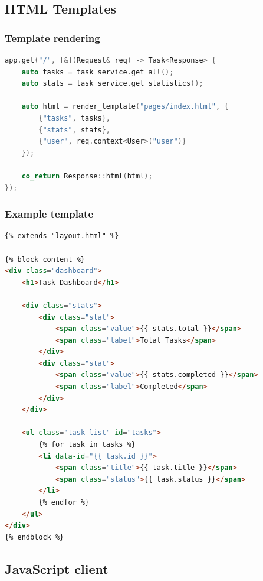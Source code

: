 \subsection{HTML Templates}

\subsubsection{Template rendering}

\begin{lstlisting}[language=C++, basicstyle=\small\ttfamily, caption={Template rendering}]
app.get("/", [&](Request& req) -> Task<Response> {
    auto tasks = task_service.get_all();
    auto stats = task_service.get_statistics();
    
    auto html = render_template("pages/index.html", {
        {"tasks", tasks},
        {"stats", stats},
        {"user", req.context<User>("user")}
    });
    
    co_return Response::html(html);
});
\end{lstlisting}

\subsubsection{Example template}

\begin{lstlisting}[language=HTML, basicstyle=\small\ttfamily, caption={Dashboard template}]
{% extends "layout.html" %}

{% block content %}
<div class="dashboard">
    <h1>Task Dashboard</h1>
    
    <div class="stats">
        <div class="stat">
            <span class="value">{{ stats.total }}</span>
            <span class="label">Total Tasks</span>
        </div>
        <div class="stat">
            <span class="value">{{ stats.completed }}</span>
            <span class="label">Completed</span>
        </div>
    </div>
    
    <ul class="task-list" id="tasks">
        {% for task in tasks %}
        <li data-id="{{ task.id }}">
            <span class="title">{{ task.title }}</span>
            <span class="status">{{ task.status }}</span>
        </li>
        {% endfor %}
    </ul>
</div>
{% endblock %}
\end{lstlisting}

\subsection{JavaScript client}


